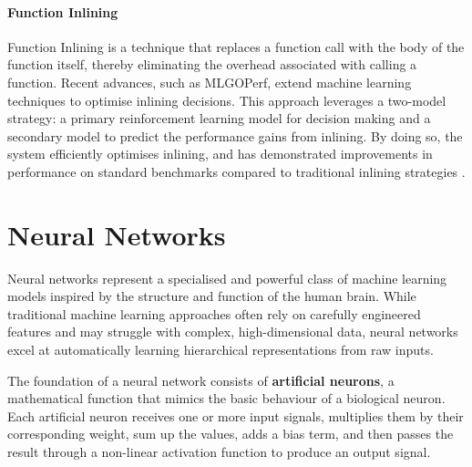 \paragraph{Function Inlining} Function Inlining is a technique that replaces a function call with the body of the function itself, thereby eliminating the overhead associated with calling a function. Recent advances, such as MLGOPerf, extend machine learning techniques to optimise inlining decisions. This approach leverages a two-model strategy: a primary reinforcement learning model for decision making and a secondary model to predict the performance gains from inlining. By doing so, the system efficiently optimises inlining, and has demonstrated improvements in performance on standard benchmarks compared to traditional inlining strategies \cite{FunctionInliningML}.

    

\section{Neural Networks}
Neural networks represent a specialised and powerful class of machine learning models inspired by the structure and function of the human brain. While traditional machine learning approaches often rely on carefully engineered features and may struggle with complex, high-dimensional data, neural networks excel at automatically learning hierarchical representations from raw inputs.

The foundation of a neural network consists of \textbf{artificial neurons}, a mathematical function that mimics the basic behaviour of a biological neuron. Each artificial neuron receives one or more input signals, multiplies them by their corresponding weight, sum up the values, adds a bias term, and then passes the result through a non-linear activation function to produce an output signal.


